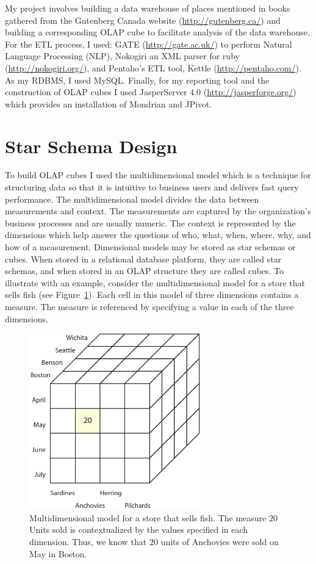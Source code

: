 My project involves building a data warehouse of places mentioned in books gathered from the Gutenberg Canada website (\url{http://gutenberg.ca/}) and building
a corresponding OLAP cube to facilitate analysis of the data warehouse. For the ETL process, I used: GATE (\url{http://gate.ac.uk/}) to perform Natural
Language Processing (NLP), Nokogiri an XML parser for ruby (\url{http://nokogiri.org/}), and Pentaho’s ETL tool, Kettle (\url{http://pentaho.com/}). As my
RDBMS, I used MySQL. Finally, for my reporting tool and the construction of OLAP cubes I used JasperServer 4.0 (\url{http://jasperforge.org/}) which provides
an installation of Mondrian and JPivot.


\section{Star Schema Design} %
\label{sec:star_schema}

To build OLAP cubes I used the multidimensional model which is a technique for structuring data so that it is intuitive to business users and delivers fast
query performance. The multidimensional model divides the data between measurements and context. The measurements are captured by the organization's business
processes and are usually numeric. The context is represented by the dimensions which help answer the questions of who, what, when, where, why, and how of a
measurement. Dimensional models may be stored as star schemas or cubes. When stored in a relational database platform, they are called star schemas, and when
stored in an OLAP structure they are called cubes. To illustrate with an example, consider the multidimensional model for a store that sells fish (see
Figure~\ref{fig:figures_FishMDModel}). Each cell in this model of three dimensions contains a measure. The measure is referenced by specifying a value in each of the three dimensions.

\begin{figure}[htbp]
    \centering
        \includegraphics[height=3in]{figures/FishMDModel.pdf}
    \caption{Multidimensional model for a store that sells fish. The measure $20$ Units sold is contextualized by the values specified in each dimension. Thus, we know that $20$ units of Anchovies were sold on May in Boston.}
    \label{fig:figures_FishMDModel}
\end{figure}

